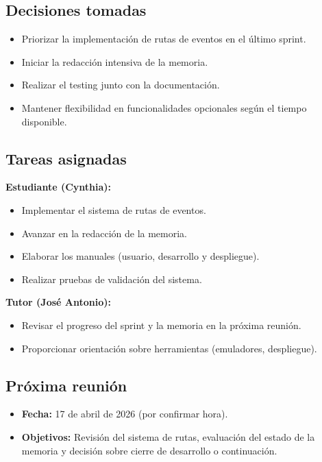 \subsection*{Decisiones tomadas}
\begin{itemize}
    \item Priorizar la implementación de rutas de eventos en el último sprint.
    \item Iniciar la redacción intensiva de la memoria.
    \item Realizar el testing junto con la documentación.
    \item Mantener flexibilidad en funcionalidades opcionales según el tiempo disponible.
\end{itemize}

\subsection*{Tareas asignadas}

\textbf{Estudiante (Cynthia):}
\begin{itemize}
    \item Implementar el sistema de rutas de eventos.
    \item Avanzar en la redacción de la memoria.
    \item Elaborar los manuales (usuario, desarrollo y despliegue).
    \item Realizar pruebas de validación del sistema.
\end{itemize}

\textbf{Tutor (José Antonio):}
\begin{itemize}
    \item Revisar el progreso del sprint y la memoria en la próxima reunión.
    \item Proporcionar orientación sobre herramientas (emuladores, despliegue).
\end{itemize}

\subsection*{Próxima reunión}
\begin{itemize}
    \item \textbf{Fecha:} 17 de abril de 2026 (por confirmar hora).
    \item \textbf{Objetivos:} Revisión del sistema de rutas, evaluación del estado de la memoria y decisión sobre cierre de desarrollo o continuación.
\end{itemize}


